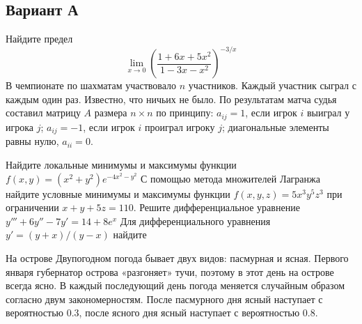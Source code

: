 \documentclass[addpoints, answers]{exam} %
\begin{document}
\subsection{Вариант А}
\begin{questions}
\question  Найдите предел
\[
\lim_{x\to 0} \left(\frac{1+6x+5x^2}{1-3x-x^2} \right)^{-3/x}
\]
\question В чемпионате по шахматам участвовало $n$ участников. Каждый участник сыграл с каждым один раз. Известно, что ничьих не было. По результатам матча судья составил матрицу $A$ размера $n\times n$ по принципу: $a_{ij}=1$, если игрок $i$ выиграл у игрока $j$; $a_{ij}=-1$, если игрок $i$ проиграл игроку $j$; диагональные элементы равны нулю, $a_{ii}=0$.
\question Найдите локальные минимумы и максимумы функции $f(x,y)=(x^2+y^2)e^{-4x^2-y^2}$
\question С помощью метода множителей Лагранжа найдите условные минимумы и максимумы функции $f(x,y,z)=5x^3y^5z^3$ при ограничении $x+y+5z=110$.
\question Решите дифференциальное уравнение $y'''+6y''-7y'=14+8e^{x}$
\question Для дифференциального уравнения $y'=(y+x)/(y-x)$ найдите
\question На острове Двупогодном погода бывает двух видов: пасмурная и ясная. Первого января губернатор острова «разгоняет»  тучи, поэтому в этот день на острове всегда ясно. В каждый последующий день погода меняется случайным образом согласно двум закономерностям. После пасмурного дня ясный наступает с  вероятностью 0.3, после ясного дня ясный наступает с вероятностью 0.8.
\begin{parts}

\end{parts}
\end{questions}
\end{document}
